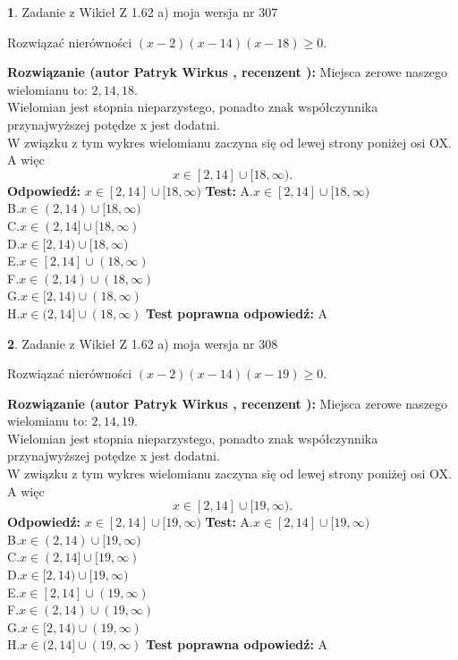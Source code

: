 \documentclass[12pt, a4paper]{article}
\theoremstyle{definition} %
\newtheorem{zad}{}
\newcommand{\zadStart}[1]{\begin{zad}#1\newline}
\newcommand{\zadStop}{\end{zad}}
\newcommand{\rozwStart}[2]{\noindent \textbf{Rozwiązanie (autor #1 , recenzent #2): }\newline}
\newcommand{\rozwStop}{\newline}
\newcommand{\odpStart}{\noindent \textbf{Odpowiedź:}\newline}
\newcommand{\odpStop}{\newline}
\newcommand{\testStart}{\noindent \textbf{Test:}\newline}
\newcommand{\testStop}{\newline}
\newcommand{\kluczStart}{\noindent \textbf{Test poprawna odpowiedź:}\newline}
\newcommand{\kluczStop}{\newline}
\begin{document}
\zadStart{Zadanie z Wikieł Z 1.62 a) moja wersja nr 307}

Rozwiązać nierówności $(x-2)(x-14)(x-18)\ge0$.
\zadStop
\rozwStart{Patryk Wirkus}{}
Miejsca zerowe naszego wielomianu to: $2, 14, 18$.\\
Wielomian jest stopnia nieparzystego, ponadto znak współczynnika przy\linebreak najwyższej potędze x jest dodatni.\\ W związku z tym wykres wielomianu zaczyna się od lewej strony poniżej osi OX. A więc $$x \in [2,14] \cup [18,\infty).$$
\rozwStop
\odpStart
$x \in [2,14] \cup [18,\infty)$
\odpStop
\testStart
A.$x \in [2,14] \cup [18,\infty)$\\
B.$x \in (2,14) \cup [18,\infty)$\\
C.$x \in (2,14] \cup [18,\infty)$\\
D.$x \in [2,14) \cup [18,\infty)$\\
E.$x \in [2,14] \cup (18,\infty)$\\
F.$x \in (2,14) \cup (18,\infty)$\\
G.$x \in [2,14) \cup (18,\infty)$\\
H.$x \in (2,14] \cup (18,\infty)$
\testStop
\kluczStart
A
\kluczStop



\zadStart{Zadanie z Wikieł Z 1.62 a) moja wersja nr 308}

Rozwiązać nierówności $(x-2)(x-14)(x-19)\ge0$.
\zadStop
\rozwStart{Patryk Wirkus}{}
Miejsca zerowe naszego wielomianu to: $2, 14, 19$.\\
Wielomian jest stopnia nieparzystego, ponadto znak współczynnika przy\linebreak najwyższej potędze x jest dodatni.\\ W związku z tym wykres wielomianu zaczyna się od lewej strony poniżej osi OX. A więc $$x \in [2,14] \cup [19,\infty).$$
\rozwStop
\odpStart
$x \in [2,14] \cup [19,\infty)$
\odpStop
\testStart
A.$x \in [2,14] \cup [19,\infty)$\\
B.$x \in (2,14) \cup [19,\infty)$\\
C.$x \in (2,14] \cup [19,\infty)$\\
D.$x \in [2,14) \cup [19,\infty)$\\
E.$x \in [2,14] \cup (19,\infty)$\\
F.$x \in (2,14) \cup (19,\infty)$\\
G.$x \in [2,14) \cup (19,\infty)$\\
H.$x \in (2,14] \cup (19,\infty)$
\testStop
\kluczStart
A
\kluczStop
\end{document}
